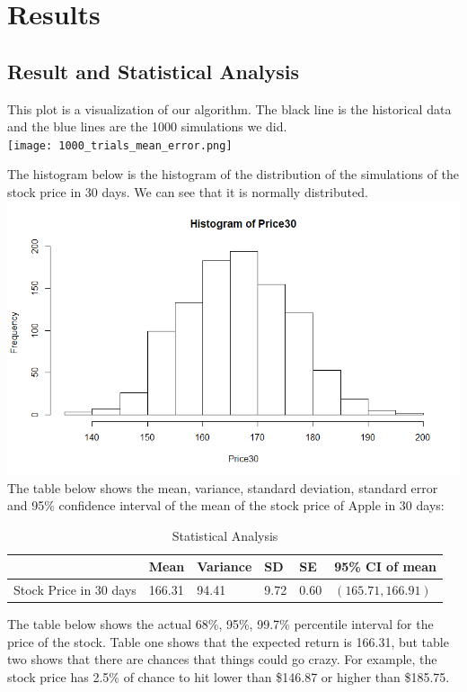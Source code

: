 \documentclass{article}
\begin{document}
\section{Results}

\subsection{Result and Statistical Analysis}
This plot is a visualization of our algorithm. The black line is the historical data and the blue lines are the 1000 simulations we did. 
\\
\texttt{[image: 1000\_trials\_mean\_error.png]}

The histogram below is the histogram of the distribution of the simulations of the stock price in 30 days. We can see that it is normally distributed. \\
\includegraphics[width = \textwidth]{Rplot.png}
The table below shows the mean, variance, standard deviation, standard error and 95\% confidence interval of the mean of the stock price of Apple in 30 days:
\begin{table}[hbt]
  \centering
  \caption{Statistical Analysis}
  \label{stat}
  \begin{tabular}{|l|l|l|l|l|l|}
  \hline
  \multicolumn{1}{|c|}{} & Mean   & Variance & SD & SE & 95\% CI of mean\\ \hline
  Stock Price in 30 days & 166.31 & 94.41    & 9.72               & 0.60           & $\left(165.71, 166.91\right) $      \\ \hline
  \end{tabular}
\end{table}

The table below shows the actual 68\%, 95\%, 99.7\% percentile interval for the price of the stock. Table one shows that the expected return is 166.31, but table two shows that there are chances that things could go crazy. For example, the stock price has 2.5\% of chance to hit lower than \$146.87 or higher than \$185.75. 
\end{document}
